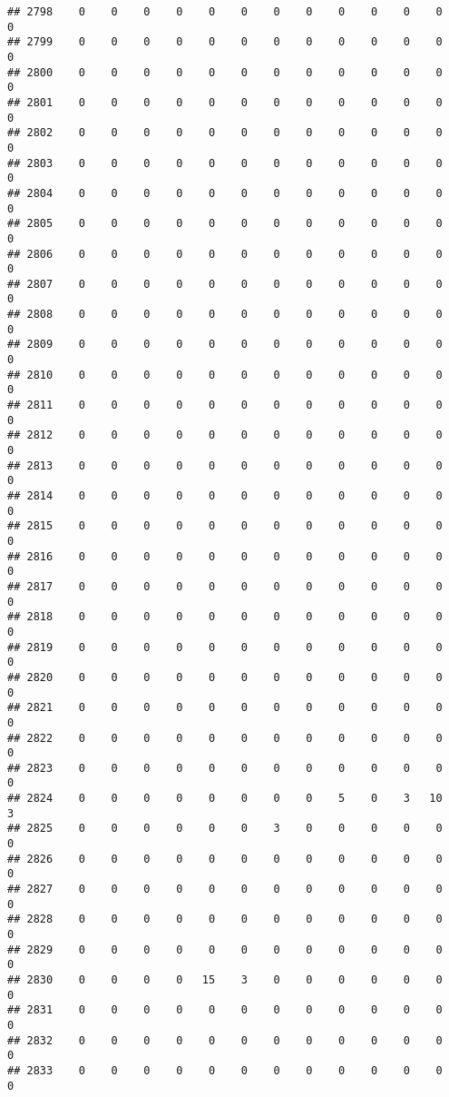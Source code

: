 \documentclass[]{article}
\begin{document}
\begin{verbatim}
## 2798    0    0    0    0    0    0    0    0    0    0    0    0    0
## 2799    0    0    0    0    0    0    0    0    0    0    0    0    0
## 2800    0    0    0    0    0    0    0    0    0    0    0    0    0
## 2801    0    0    0    0    0    0    0    0    0    0    0    0    0
## 2802    0    0    0    0    0    0    0    0    0    0    0    0    0
## 2803    0    0    0    0    0    0    0    0    0    0    0    0    0
## 2804    0    0    0    0    0    0    0    0    0    0    0    0    0
## 2805    0    0    0    0    0    0    0    0    0    0    0    0    0
## 2806    0    0    0    0    0    0    0    0    0    0    0    0    0
## 2807    0    0    0    0    0    0    0    0    0    0    0    0    0
## 2808    0    0    0    0    0    0    0    0    0    0    0    0    0
## 2809    0    0    0    0    0    0    0    0    0    0    0    0    0
## 2810    0    0    0    0    0    0    0    0    0    0    0    0    0
## 2811    0    0    0    0    0    0    0    0    0    0    0    0    0
## 2812    0    0    0    0    0    0    0    0    0    0    0    0    0
## 2813    0    0    0    0    0    0    0    0    0    0    0    0    0
## 2814    0    0    0    0    0    0    0    0    0    0    0    0    0
## 2815    0    0    0    0    0    0    0    0    0    0    0    0    0
## 2816    0    0    0    0    0    0    0    0    0    0    0    0    0
## 2817    0    0    0    0    0    0    0    0    0    0    0    0    0
## 2818    0    0    0    0    0    0    0    0    0    0    0    0    0
## 2819    0    0    0    0    0    0    0    0    0    0    0    0    0
## 2820    0    0    0    0    0    0    0    0    0    0    0    0    0
## 2821    0    0    0    0    0    0    0    0    0    0    0    0    0
## 2822    0    0    0    0    0    0    0    0    0    0    0    0    0
## 2823    0    0    0    0    0    0    0    0    0    0    0    0    0
## 2824    0    0    0    0    0    0    0    0    5    0    3   10    3
## 2825    0    0    0    0    0    0    3    0    0    0    0    0    0
## 2826    0    0    0    0    0    0    0    0    0    0    0    0    0
## 2827    0    0    0    0    0    0    0    0    0    0    0    0    0
## 2828    0    0    0    0    0    0    0    0    0    0    0    0    0
## 2829    0    0    0    0    0    0    0    0    0    0    0    0    0
## 2830    0    0    0    0   15    3    0    0    0    0    0    0    0
## 2831    0    0    0    0    0    0    0    0    0    0    0    0    0
## 2832    0    0    0    0    0    0    0    0    0    0    0    0    0
## 2833    0    0    0    0    0    0    0    0    0    0    0    0    0

\end{verbatim}
\end{document}
